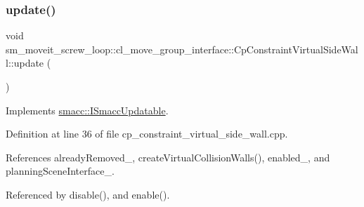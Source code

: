 \subsubsection{\texorpdfstring{update()}{update()}}
{\footnotesize\ttfamily void sm\+\_\+moveit\+\_\+screw\+\_\+loop\+::cl\+\_\+move\+\_\+group\+\_\+interface\+::\+Cp\+Constraint\+Virtual\+Side\+Wall\+::update (\begin{DoxyParamCaption}{ }\end{DoxyParamCaption})\hspace{0.3cm}{\ttfamily [virtual]}}



Implements \hyperlink{classsmacc_1_1ISmaccUpdatable_a84ee0520cbefdb1d412bed54650b028e}{smacc\+::\+I\+Smacc\+Updatable}.



Definition at line 36 of file cp\+\_\+constraint\+\_\+virtual\+\_\+side\+\_\+wall.\+cpp.



References already\+Removed\+\_\+, create\+Virtual\+Collision\+Walls(), enabled\+\_\+, and planning\+Scene\+Interface\+\_\+.



Referenced by disable(), and enable().


